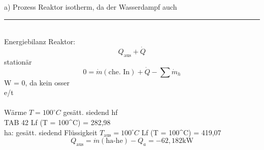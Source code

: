 a) Prozess Reaktor isotherm, da der Wasserdampf auch \\
\hspace{1cm} \rule{5cm}{0.5pt} \\
Energiebilanz Reaktor: \\
\[
Q_{\text{aus}} + \dot{Q}
\]
stationär \\
\[
0 = \dot{m} (\text{che. In}) + \dot{Q} - \sum \dot{m}_h
\]
\hspace{1cm} W = 0, da kein osser \\
\hspace{1cm} \rightarrow {}e/t  \\
\hspace{1cm}  \\
Wärme $T = 100^\circ C$ \rightarrow gesätt. siedend \rightarrow hf \\
TAB 42 Lf (T = 100^\circ C) = 282,98  \\
\hspace{1cm} ha: \downarrow gesätt. siedend Flüssigkeit $T_{\text{aus}} = 100^\circ C$ Lf (T = 100^\circ C) = 419,07  \\
\[
Q_{\text{aus}} = \dot{m} (\text{ha-he}) - Q_a = -62,182 \text{kW}
\]
